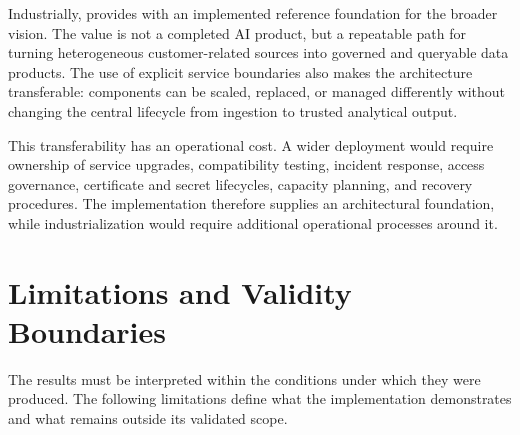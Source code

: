 Industrially, \projectname{} provides \companyname{} with an implemented reference foundation for the broader \initiative{} vision. The value is not a completed AI product, but a repeatable path for turning heterogeneous customer-related sources into governed and queryable data products. The use of explicit service boundaries also makes the architecture transferable: components can be scaled, replaced, or managed differently without changing the central lifecycle from ingestion to trusted analytical output.

This transferability has an operational cost. A wider deployment would require ownership of service upgrades, compatibility testing, incident response, access governance, certificate and secret lifecycles, capacity planning, and recovery procedures. The implementation therefore supplies an architectural foundation, while industrialization would require additional operational processes around it.

\section{Limitations and Validity Boundaries}
The results must be interpreted within the conditions under which they were produced. The following limitations define what the implementation demonstrates and what remains outside its validated scope.

